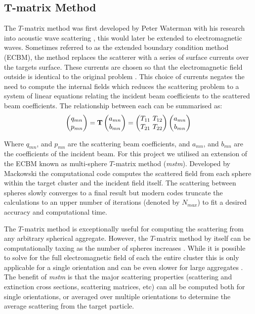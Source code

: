 \subsection{T-matrix Method}
The $T$-matrix method was first developed by Peter Waterman with his
research into acoustic wave scattering \cite{Waterman1969}, this 
would later be extended to electromagnetic waves. Sometimes  
referred to as the extended boundary condition method (ECBM), 
the method replaces the scatterer with a series of surface currents
over the targets surface. These currents are chosen so that the
electromagnetic field outside is identical to the original problem 
\cite{Wriedt1998}. This choice of currents negates the need to 
compute the internal fields which reduces the scattering problem 
to a system of linear equations relating the incident beam coefficients 
to the scattered beam coefficients. The relationship between each can 
be summarised as:
\begin{align}
	\label{eq:t_matrix}
	\begin{pmatrix}
		q_{mn} \\
		p_{mn} 
	\end{pmatrix}
	= \bold{T} 
	\begin{pmatrix}
		a_{mn} \\
		b_{mn}
	\end{pmatrix}
	= \begin{pmatrix}
		T_{11} \ T_{12} \\
		T_{21} \ T_{22}
	\end{pmatrix}
	\begin{pmatrix}
		a_{mn} \\
		b_{mn}
	\end{pmatrix}
\end{align}

Where $q_{mn}$, and $p_{mn}$ are the scattering beam coefficients, and
$a_{mn}$, and $b_{mn}$ are the coefficients of the incident beam. For 
this project we utilised an extension of the ECBM known as 
multi-sphere $T$-matrix method (\textit{mstm}). Developed by Mackowski
\cite{Mackowski2011} the computational code computes the scattered field 
from each sphere within the target cluster and the incident field itself. 
The scattering between spheres slowly converges to a final result but modern 
codes truncate the calculations to an upper number of iterations (denoted by
$N_{max}$) to fit a desired accuracy and computational time. 

The $T$-matrix method is exceptionally useful for computing the scattering 
from any arbitrary spherical aggregate. However, the $T$-matrix method by 
itself can be computationally taxing as the number of spheres increases 
\cite{Mackowski2011}. While it is possible to solve for the full electromagnetic 
field of each the entire cluster this is only applicable for a single 
orientation and can be even slower for large aggregates \cite{Mackowski1996, 
Xu1995}. The benefit of \textit{mstm} is that the major scattering properties 
(scattering and extinction cross sections, scattering matrices, etc) can 
all be computed both for single orientations, or averaged over multiple 
orientations to determine the average scattering from the target particle. 

